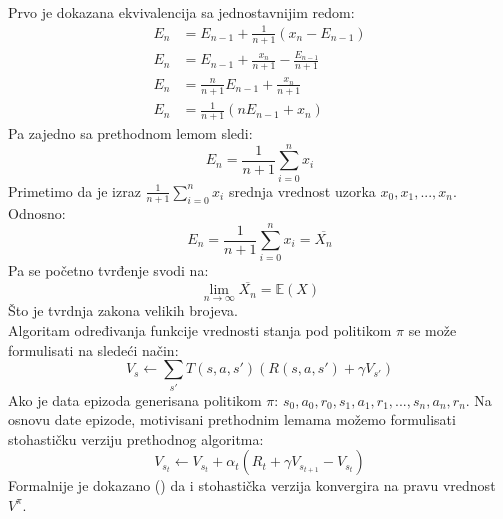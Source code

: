 \documentclass[a4paper,fleqn,12pt]{JMThesis}
\newcommand{\latin}{\fontencoding{T1}\selectfont\selectlanguage{english}}
\theoremstyle{plain}
\theoremstyle{definition}
\theoremstyle{definition}
\begin{document}
\\
Prvo je dokazana ekvivalencija sa jednostavnijim redom:
\[
	\begin{split}
		E_n &= E_{n-1} + \frac{1}{n+1}(x_n - E_{n-1})\\
		E_n &= E_{n-1} + \frac{x_n}{n+1} - \frac{E_{n-1}}{n+1}\\
		E_n &= \frac{n}{n+1}E_{n-1} + \frac{x_n}{n+1}\\
		E_n &=  \frac{1}{n+1}(n E_{n-1} + x_n)
	\end{split}
\]
Pa zajedno sa prethodnom lemom sledi:
\[E_n = \frac{1}{n+1}\sum_{i=0}^n x_i\]
Primetimo da je izraz $\frac{1}{n+1}\sum_{i=0}^n x_i$ srednja vrednost uzorka $x_0, x_1, ... , x_n$. Odnosno:
\[E_n = \frac{1}{n+1}\sum_{i=0}^n x_i = \overline{X_n}	\]
Pa se početno tvrđenje svodi na:
\[ \lim_{n \to \infty} \overline{X_n} = \mathbb{E}(X) \]
Što je tvrdnja zakona velikih brojeva.
\medskip \\
Algoritam određivanja funkcije vrednosti stanja pod politikom $\pi$ se može formulisati na sledeći način:
\[ V_s \leftarrow \sum_{s'} T(s,a,s')(R(s,a,s') + \gamma V_{s'}) \]
Ako je data epizoda generisana politikom $\pi$: $s_0,a_0,r_0,s_1,a_1,r_1,...,s_n,a_n,r_n$.
Na osnovu date epizode, motivisani prethodnim lemama možemo formulisati stohastičku verziju prethodnog algoritma:
\[ V_{s_t} \leftarrow V_{s_t} + \alpha_t (R_t + \gamma V_{s_{t+1}} - V_{s_t}) \]
Formalnije je dokazano ({\latin \cite{sutton2018reinforcement}}) da i stohastička verzija konvergira na pravu vrednost $V^{\pi}$. 
\end{document}
